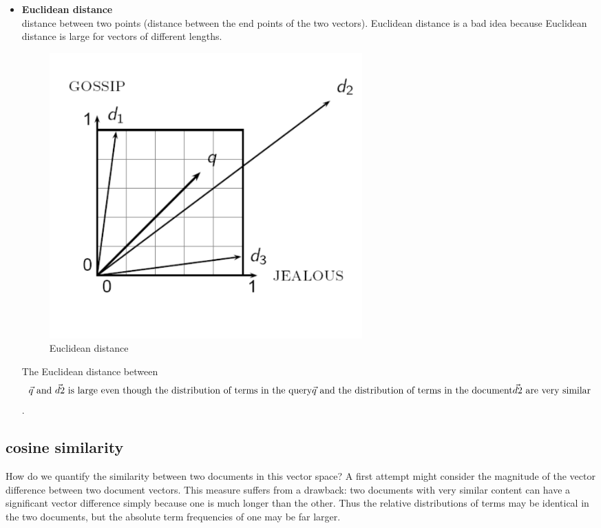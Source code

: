\begin{itemize}
     \item \textbf{Euclidean distance}\\
     distance between two points (distance between the end points of the two vectors). 
     Euclidean distance is a bad idea because Euclidean distance is large for vectors of different lengths.
     
     
\begin{figure}[H]%
    \center%
    \includegraphics[width=0.6\textwidth]{images/shimaa/Euclidean distance.png}
    \caption[This is Euclidean distance]{Euclidean distance}\label{fig:Euclidean distance}%
   \end{figure}

   The Euclidean distance between\displaystyle  $$\vec{q} \textrm{ and }\vec{d2 } \textrm{  is large even though the distribution of terms in the query}\\ \displaystyle \vec{q}\textrm{  and the distribution of terms in the document} \vec{d2} \textrm {  are very similar}$$.  
  
\end{itemize}   

\subsection{cosine similarity}

How do we quantify the similarity between two documents in this vector
space? A first attempt might consider the magnitude of the vector difference
between two document vectors.
This measure suffers from a drawback: two documents with very similar content can have a significant vector difference simply because one is much longer than the other. Thus the relative distributions of terms may be identical in the two documents, but the absolute term frequencies of one may be far larger.

